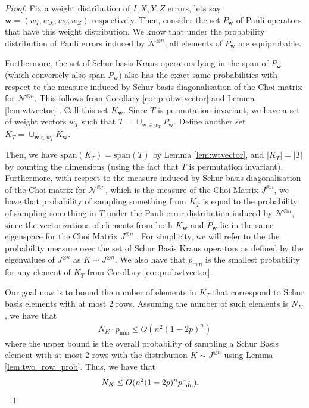 \documentclass[11pt]{article}
\begin{document}
\begin{proof}
    Fix a weight distribution of $I,X,Y,Z$ errors, lets say $\mathbf w=(w_I,w_X,w_Y,w_Z)$ respectively. Then, consider the set $P_{\mathbf w}$ of Pauli operators that have this weight distribution. We know that under the probability distribution of Pauli errors induced by $\mathcal N^{\otimes n}$, all elements of $P_{\mathbf w}$ are equiprobable. 

    Furthermore, the set of Schur basis Kraus operators lying in the span of $P_{\mathbf w}$ (which conversely also span $P_{\mathbf w})$ also has the exact same probabilities with respect to the measure induced by Schur basis diagonalisation of the Choi matrix for $\mathcal N^{\otimes n}$.  This follows from Corollary \ref{cor:probwtvector} and Lemma \ref{lem:wtvector}  . Call this set $K_{\mathbf w}$. Since $T$ is permutation invariant, we have a set of weight vectors $w_T$ such that $T=\cup_{\mathbf w\in w_T} P_\mathbf{w}$. Define another set $K_T=\cup_{\mathbf w\in w_T} K_{\mathbf w} $.

    Then, we have $\mathrm{span}(K_T)=\mathrm{span}(T)$ by Lemma \ref{lem:wtvector}, and $|K_T|=|T|$ by counting the dimensions (using the fact that $T$ is permutation invariant). Furthermore, with respect to the measure induced by Schur basis diagonalisation of the Choi matrix for $\mathcal N^{\otimes n}$, which is the  measure of the Choi Matrix $J^{\otimes n}$, we have that probability of sampling something from $K_T$ is equal to the probability of sampling something in $T$ under the Pauli error distribution induced by $\mathcal N^{\otimes n}$, since the vectorizations of elements from both $K_\mathbf w$ and $P_{\mathbf w}$ lie in the same eigenspace for the Choi Matrix $J^{\otimes n}$ . For simplicity, we will refer to the the probability measure over the set of Schur Basis Kraus operators as defined by the eigenvalues of $J^{\otimes n}$ as $K\sim J^{\otimes n}$. We also have that $p_{\min}$ is the smallest probability for any element of $K_T$ from Corollary \ref{cor:probwtvector}.

    
    Our goal now is to bound the number of elements in $K_T$ that correspond to Schur basis elements with at most $2$ rows. Assuming the number of such elements is $N_K$, we have that
    \begin{align*}
        N_K\cdot p_{\min}\leq O(n^2(1-2p)^n)
    \end{align*}
    where the upper bound is the overall probability of sampling a Schur Basis element with at most 2 rows with the distribution $K\sim J^{\otimes n}$ using Lemma \ref{lem:two_row_prob}. Thus, we have that
    \begin{align*}
        N_K\leq O(n^2(1-2p)^np_{\min}^{-1}). &\qedhere
    \end{align*}
\end{proof}
    
    
    
    
    
    
    


    
\end{document}

